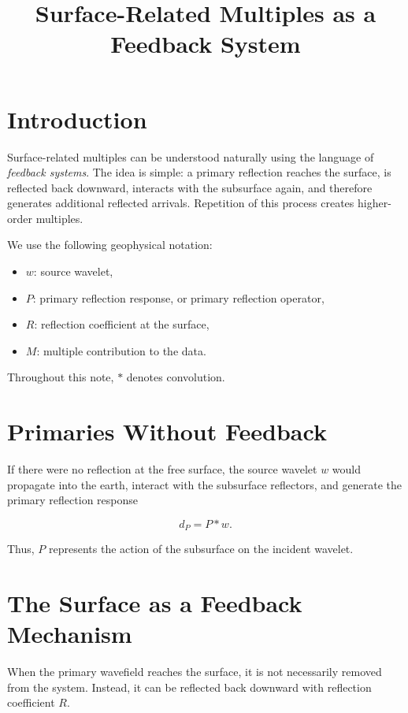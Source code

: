 \documentclass[11pt]{article}
\title{Surface-Related Multiples as a Feedback System}
\author{}
\date{}
\begin{document}
\maketitle

\section{Introduction}

Surface-related multiples can be understood naturally using the language of
\emph{feedback systems}. The idea is simple: a primary reflection reaches the
surface, is reflected back downward, interacts with the subsurface again, and
therefore generates additional reflected arrivals. Repetition of this process
creates higher-order multiples.

We use the following geophysical notation:

\begin{itemize}[leftmargin=2em]
    \item $w$: source wavelet,
    \item $P$: primary reflection response, or primary reflection operator,
    \item $R$: reflection coefficient at the surface,
    \item $M$: multiple contribution to the data.
\end{itemize}

Throughout this note, $*$ denotes convolution.

\section{Primaries Without Feedback}

If there were no reflection at the free surface, the source wavelet $w$ would
propagate into the earth, interact with the subsurface reflectors, and generate
the primary reflection response

\begin{equation}
d_P = P * w.
\end{equation}

Thus, $P$ represents the action of the subsurface on the incident wavelet.

\section{The Surface as a Feedback Mechanism}

When the primary wavefield reaches the surface, it is not necessarily removed
from the system. Instead, it can be reflected back downward with reflection
coefficient $R$.
\end{document}
